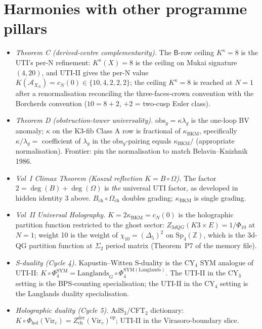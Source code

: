 \documentclass[11pt]{amsart}
\theoremstyle{definition}
\theoremstyle{remark}
\newcommand{\kBKM}{\kappa_{\mathrm{BKM}}}
\begin{document}
\section{Harmonies with other programme pillars}

\begin{itemize}
\item \emph{Theorem C (derived-centre complementarity).} The $\mathsf{B}$-row ceiling
$K^\kappa = 8$ is the UTI's per-N refinement: $K^\kappa(X) = 8$ is the ceiling on Mukai
signature~$(4,20)$, and UTI-II gives the per-N value
$K(\mathcal{A}_{X_N}) = c_N(0) \in \{10, 4, 2, 2, 2\}$; the ceiling
$K^\kappa = 8$ is reached at $N = 1$ after a renormalisation reconciling the three-faces-crown
convention with the Borcherds convention ($10 = 8 + 2$, $+2$ = two-cusp Euler class).

\item \emph{Theorem D (obstruction-tower universality).} $\mathrm{obs}_g = \kappa \lambda_g$ is
the one-loop BV anomaly; $\kappa$ on the K3-fib Class A row is fractional of
$\kBKM$, specifically $\kappa/\lambda_g = $ coefficient of $\lambda_g$ in the
$\mathrm{obs}_g$-pairing equals $\kBKM / $ (appropriate normalisation). Frontier: pin the
normalisation to match Belavin--Knizhnik 1986.

\item \emph{Vol~I Climax Theorem (Koszul reflection $K = B \circ \Omega$).} The factor
$2 = \deg(B) + \deg(\Omega)$ is \emph{the} universal UTI factor, as developed in hidden identity
3 above. $B_{\mathrm{ch}} \circ \Omega_{\mathrm{ch}}$ doubles grading; $\kBKM$ is single grading.

\item \emph{Vol~II Universal Holography.} $K = 2 \kBKM = c_N(0)$ is the holographic partition
function restricted to the ghost sector: $Z_{3d QG}(K3 \times E) = 1/\Phi_{10}$ at $N = 1$;
weight 10 is the weight of $\chi_{10} = (\Delta_5)^2$ on $\mathrm{Sp}_4(\mathbb{Z})$, which is
the 3d-QG partition function at $\Sigma_2$ period matrix (Theorem~P7 of the memory file).

\item \emph{S-duality (Cycle 4).} Kapustin--Witten S-duality is the CY$_4$ SYM analogue of UTI-II:
$K \circ \Phi_4^{\mathrm{SYM}} = \mathrm{Langlands}_G \circ \Phi_4^{\mathrm{SYM}(\mathrm{Langlands})}$.
The UTI-II in the CY$_3$ setting is the BPS-counting specialisation; the UTI-II in the CY$_4$
setting is the Langlands duality specialisation.

\item \emph{Holographic duality (Cycle 5).} AdS$_3$/CFT$_2$ dictionary:
$K \circ \Phi_{\mathrm{hol}}(\mathrm{Vir}_c) = Z^{\mathrm{der}}_{\mathrm{ch}}(\mathrm{Vir}_c)^{\mathrm{op}}$;
UTI-II in the Virasoro-boundary slice.
\end{itemize}
\end{document}
